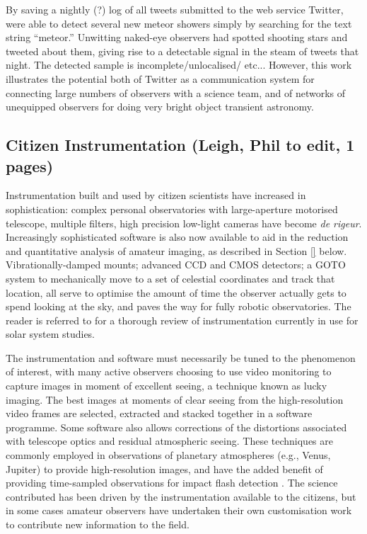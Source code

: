 \documentclass{ar2e}
\begin{document}
By saving a nightly (?) log of all tweets submitted to the web service
Twitter, \citet{Barentsen++2010} were able to 
detect several new meteor showers simply by searching for the text string
``meteor.'' Unwitting naked-eye observers had spotted shooting stars and
tweeted about them, giving rise to a detectable signal in the steam of tweets
that night. The detected sample is incomplete/unlocalised/ etc... However,
this work illustrates the potential both of Twitter as a communication system
for connecting large numbers of observers with a science team, and of networks
of unequipped observers for doing very bright object transient astronomy.



\subsection{Citizen Instrumentation (\textbf{Leigh}, Phil to edit, 1 pages)}
\label{sec:instr}

Instrumentation built and used by citizen scientists have increased in
sophistication: complex personal observatories with large-aperture motorised
telescope, multiple filters, high precision low-light cameras have become {\it
de rigeur}.  Increasingly sophisticated software is also now available to aid
in the reduction and quantitative analysis of amateur imaging, as described in
Section \ref{} below.  Vibrationally-damped mounts; advanced CCD and CMOS
detectors; a GOTO system to mechanically move to a set of celestial
coordinates and track that location, all serve to optimise the amount of time
the observer actually gets to spend looking at the sky, and paves the way for
fully robotic observatories.  The reader is referred to \citet{13mousis} for a
thorough review of instrumentation currently in use for solar system studies.

The instrumentation and software must necessarily be tuned to the phenomenon
of interest, with many active observers choosing to use video monitoring to
capture images in moment of excellent seeing, a technique known as lucky
imaging.  The best images at moments of clear seeing from the high-resolution
video frames are selected, extracted and stacked together in a software
programme.  Some software also allows corrections of the distortions
associated with telescope optics and residual atmospheric seeing.  These
techniques are commonly employed in observations of planetary atmospheres
(e.g., Venus, Jupiter) to provide high-resolution images, and have the added
benefit of providing time-sampled observations for impact flash detection
\citep[e.g.,][]{10hueso}.
The science contributed has been driven by the instrumentation available to
the citizens, but in some cases amateur observers have undertaken their own
customisation work to contribute new information to the field.  
\end{document}
